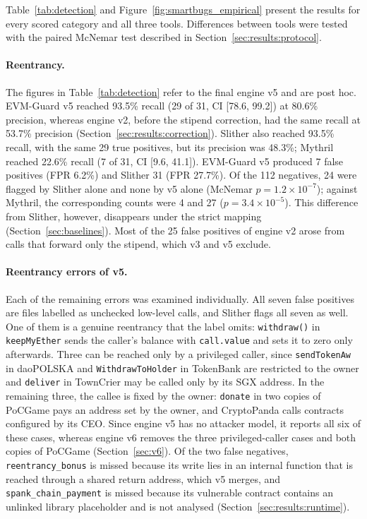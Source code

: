 \documentclass[pdflatex,sn-mathphys]{sn-jnl}
\theoremstyle{thmstyletwo}
\theoremstyle{thmstyletwo}
\begin{document}
Table~\ref{tab:detection} and Figure~\ref{fig:smartbugs_empirical} present the results for every scored category and all three tools. Differences between tools were tested with the paired McNemar test described in Section~\ref{sec:results:protocol}.

\paragraph{Reentrancy.} The figures in Table~\ref{tab:detection} refer to the final engine v5 and are post hoc. EVM-Guard v5 reached 93.5\% recall (29 of 31, CI [78.6, 99.2]) at 80.6\% precision, whereas engine v2, before the stipend correction, had the same recall at 53.7\% precision (Section~\ref{sec:results:correction}). Slither also reached 93.5\% recall, with the same 29 true positives, but its precision was 48.3\%; Mythril reached 22.6\% recall (7 of 31, CI [9.6, 41.1]). EVM-Guard v5 produced 7 false positives (FPR 6.2\%) and Slither 31 (FPR 27.7\%). Of the 112 negatives, 24 were flagged by Slither alone and none by v5 alone (McNemar $p = 1.2 \times 10^{-7}$); against Mythril, the corresponding counts were 4 and 27 ($p = 3.4 \times 10^{-5}$). This difference from Slither, however, disappears under the strict mapping (Section~\ref{sec:baselines}). Most of the 25 false positives of engine v2 arose from calls that forward only the stipend, which v3 and v5 exclude.

\paragraph{Reentrancy errors of v5.} Each of the remaining errors was examined individually. All seven false positives are files labelled as unchecked low-level calls, and Slither flags all seven as well. One of them is a genuine reentrancy that the label omits: \texttt{withdraw()} in \texttt{keepMyEther} sends the caller's balance with \texttt{call.value} and sets it to zero only afterwards. Three can be reached only by a privileged caller, since \texttt{sendTokenAw} in daoPOLSKA and \texttt{WithdrawToHolder} in TokenBank are restricted to the owner and \texttt{deliver} in TownCrier may be called only by its SGX address. In the remaining three, the callee is fixed by the owner: \texttt{donate} in two copies of PoCGame pays an address set by the owner, and CryptoPanda calls contracts configured by its CEO. Since engine v5 has no attacker model, it reports all six of these cases, whereas engine v6 removes the three privileged-caller cases and both copies of PoCGame (Section~\ref{sec:v6}). Of the two false negatives, \texttt{reentrancy\_bonus} is missed because its write lies in an internal function that is reached through a shared return address, which v5 merges, and \texttt{spank\_chain\_payment} is missed because its vulnerable contract contains an unlinked library placeholder and is not analysed (Section~\ref{sec:results:runtime}).
\end{document}
